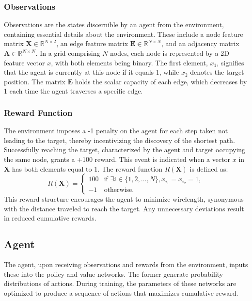 \documentclass[letterpaper]{article}
\begin{document}
\subsubsection{Observations}
Observations are the states discernible by an agent from the environment, containing essential details about the environment. These include a node feature matrix \(\mathbf{X} \in \mathbb{R}^{N \times 2}\), an edge feature matrix \(\mathbf{E} \in \mathbb{R}^{N \times N}\), and an adjacency matrix \(\mathbf{A} \in \mathbb{R}^{N \times N}\). In a grid comprising \(N\) nodes, each node is represented by a 2D feature vector \(x\), with both elements being binary. The first element, \(x_1\), signifies that the agent is currently at this node if it equals 1, while \(x_2\) denotes the target position. The matrix \(\mathbf{E}\) holds the scalar capacity of each edge, which decreases by 1 each time the agent traverses a specific edge.



\subsubsection{Reward Function}
The environment imposes a -1 penalty on the agent for each step taken not leading to the target, thereby incentivizing the discovery of the shortest path. Successfully reaching the target, characterized by the agent and target occupying the same node, grants a +100 reward. This event is indicated when a vector \(x\) in \(\mathbf{X}\) has both elements equal to 1. The reward function \( R(\mathbf{X}) \) is defined as:
\begin{equation}
    R(\mathbf{X}) = \begin{cases} 
    100 & \text{if } \exists i \in \{1, 2, \ldots, N\}, x_{i_1} = x_{i_2} = 1, \\
    -1 & \text{otherwise}.
    \end{cases}
\end{equation}
This reward structure encourages the agent to minimize wirelength, synonymous with the distance traveled to reach the target. Any unnecessary deviations result in reduced cumulative rewards.

\subsection{Agent}
The agent, upon receiving observations and rewards from the environment, inputs these into the policy and value networks. The former generate probability distributions of actions. During training, the parameters of these networks are optimized to produce a sequence of actions that maximizes cumulative reward.
\end{document}
